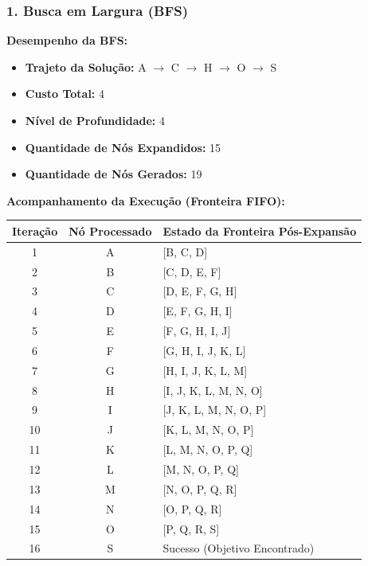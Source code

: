 \subsubsection*{1. Busca em Largura (BFS)}

\textbf{Desempenho da BFS:}
\begin{itemize}
    \item \textbf{Trajeto da Solução:} A $\rightarrow$ C $\rightarrow$ H $\rightarrow$ O $\rightarrow$ S
    \item \textbf{Custo Total:} 4
    \item \textbf{Nível de Profundidade:} 4
    \item \textbf{Quantidade de Nós Expandidos:} 15
    \item \textbf{Quantidade de Nós Gerados:} 19
\end{itemize}

\textbf{Acompanhamento da Execução (Fronteira FIFO):}
\begin{table}[h!]
\centering
\begin{tabular}{|c|c|l|}
\hline
\textbf{Iteração} & \textbf{Nó Processado} & \textbf{Estado da Fronteira Pós-Expansão} \\ \hline
1 & A & [B, C, D] \\ \hline
2 & B & [C, D, E, F] \\ \hline
3 & C & [D, E, F, G, H] \\ \hline
4 & D & [E, F, G, H, I] \\ \hline
5 & E & [F, G, H, I, J] \\ \hline
6 & F & [G, H, I, J, K, L] \\ \hline
7 & G & [H, I, J, K, L, M] \\ \hline
8 & H & [I, J, K, L, M, N, O] \\ \hline
9 & I & [J, K, L, M, N, O, P] \\ \hline
10 & J & [K, L, M, N, O, P] \\ \hline
11 & K & [L, M, N, O, P, Q] \\ \hline
12 & L & [M, N, O, P, Q] \\ \hline
13 & M & [N, O, P, Q, R] \\ \hline
14 & N & [O, P, Q, R] \\ \hline
15 & O & [P, Q, R, S] \\ \hline
16 & S & Sucesso (Objetivo Encontrado) \\ \hline
\end{tabular}
\end{table}

